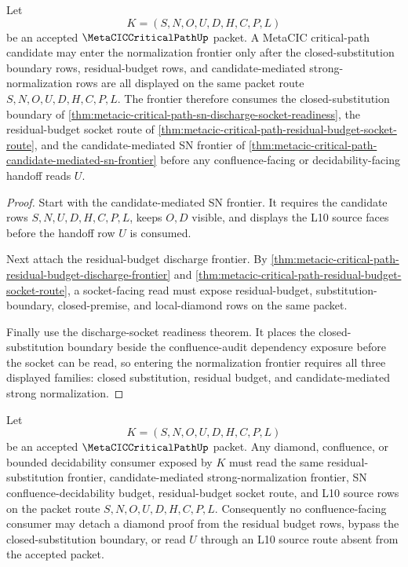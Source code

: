 \begin{theorem}
\label{thm:metacic-critical-path-residual-substitution-frontier}
Let
$$
K=(S,N,O,U,D,H,C,P,L)
$$
be an accepted $\MetaCICCriticalPathUp$ packet. A MetaCIC critical-path candidate may enter the normalization frontier only after the closed-substitution boundary rows, residual-budget rows, and candidate-mediated strong-normalization rows are all displayed on the same packet route $S,N,O,U,D,H,C,P,L$. The frontier therefore consumes the closed-substitution boundary of \autoref{thm:metacic-critical-path-sn-discharge-socket-readiness}, the residual-budget socket route of \autoref{thm:metacic-critical-path-residual-budget-socket-route}, and the candidate-mediated SN frontier of \autoref{thm:metacic-critical-path-candidate-mediated-sn-frontier} before any confluence-facing or decidability-facing handoff reads $U$.
\end{theorem}
\begin{proof}
Start with the candidate-mediated SN frontier. It requires the candidate rows $S,N,U,D,H,C,P,L$, keeps $O,D$ visible, and displays the L10 source faces before the handoff row $U$ is consumed.

Next attach the residual-budget discharge frontier. By \autoref{thm:metacic-critical-path-residual-budget-discharge-frontier} and \autoref{thm:metacic-critical-path-residual-budget-socket-route}, a socket-facing read must expose residual-budget, substitution-boundary, closed-premise, and local-diamond rows on the same packet.

Finally use the discharge-socket readiness theorem. It places the closed-substitution boundary beside the confluence-audit dependency exposure before the socket can be read, so entering the normalization frontier requires all three displayed families: closed substitution, residual budget, and candidate-mediated strong normalization.
\end{proof}

\begin{theorem}
\label{thm:metacic-critical-path-residual-substitution-diamond-budget}
Let
$$
K=(S,N,O,U,D,H,C,P,L)
$$
be an accepted $\MetaCICCriticalPathUp$ packet. Any diamond, confluence, or bounded decidability consumer exposed by $K$ must read the same residual-substitution frontier, candidate-mediated strong-normalization frontier, SN confluence-decidability budget, residual-budget socket route, and L10 source rows on the packet route $S,N,O,U,D,H,C,P,L$. Consequently no confluence-facing consumer may detach a diamond proof from the residual budget rows, bypass the closed-substitution boundary, or read $U$ through an L10 source route absent from the accepted packet.
\end{theorem}

